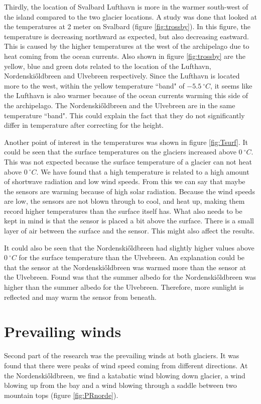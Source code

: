 \documentclass[11pt]{report}
\begin{document}
Thirdly, the location of Svalbard Lufthavn is more in the warmer south-west of the island compared to the two glacier locations. A study \cite{osby} was done that looked at the temperatures at 2 meter on Svalbard (figure \ref{fig:trossby}). In this figure, the temperature is decreasing northward as expected, but also decreasing eastward. This is caused by the higher temperatures at the west of the archipelago due to heat coming from the ocean currents. Also shown in figure \ref{fig:trossby} are the yellow, blue and green dots related to the location of the Lufthavn, Nordenski\H{o}ldbreen and Ulvebreen respectively. Since the Lufthavn is located more to the west, within the yellow temperature ``band" of $\SI{-5.5}{^\circ C}$, it seems like the Lufthavn is also warmer because of the ocean currents warming this side of the archipelago. The Nordenski\H{o}ldbreen and the Ulvebreen are in the same temperature ``band". This could explain the fact that they do not significantly differ in temperature after correcting for the height.

Another point of interest in the temperatures was shown in figure \ref{fig:Tsurf}. It could be seen that the surface temperatures on the glaciers increased above $\SI{0}{^\circ C}$. This was not expected because the surface temperature of a glacier can not heat above $\SI{0}{^\circ C}$. We have found that a high temperature is related to a high amount of shortwave radiation and low wind speeds. From this we can say that maybe the sensors are warming because of high solar radiation. Because the wind speeds are low, the sensors are not blown through to cool, and heat up, making them record higher temperatures than the surface itself has. What also needs to be kept in mind is that the sensor is placed a bit above the surface. There is a small layer of air between the surface and the sensor. This might also affect the results. 

It could also be seen that the Nordenski\H{o}ldbreen had slightly higher values above $\SI{0}{^\circ C}$ for the surface temperature than the Ulvebreen. An explanation could be that the sensor at the Nordenski\H{o}ldbreen was warmed more than the sensor at the Ulvebreen. Found was that the summer albedo for the Nordenski\H{o}ldbreen was higher than the summer albedo for the Ulvebreen. Therefore, more sunlight is reflected and may warm the sensor from beneath.\\

\section{Prevailing winds}\label{sec:pw}
Second part of the research was the prevailing winds at both glaciers. It was found that there were peaks of wind speed coming from different directions. At the Nordenski\H{o}ldbreen, we find a katabatic wind blowing down glacier, a wind blowing up from the bay and a wind blowing through a saddle between two mountain tops (figure \ref{fig:PRnorde}). 
\end{document}
